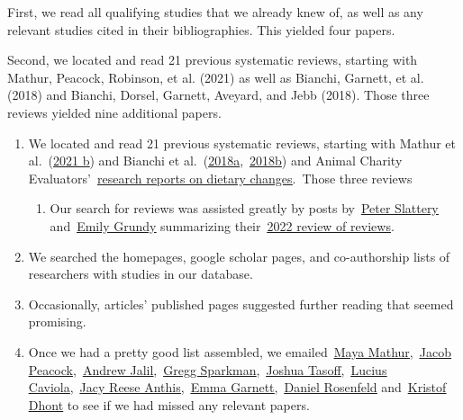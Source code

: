 \documentclass[
  man]{apa6}
\providecommand{\tightlist}{%
  \setlength{\itemsep}{0pt}\setlength{\parskip}{0pt}}
\begin{document}
First, we read all qualifying studies that we already knew of, as well as any relevant studies cited in their bibliographies. This yielded four papers.

Second, we located and read 21 previous systematic reviews, starting with Mathur, Peacock, Robinson, et al. (2021) as well as Bianchi, Garnett, et al. (2018) and Bianchi, Dorsel, Garnett, Aveyard, and Jebb (2018). Those three reviews yielded nine additional papers.

\begin{enumerate}
\def\labelenumi{\arabic{enumi}.}
\item
  We located and read 21 previous systematic reviews, starting with Mathur et al.~(\href{https://www.sciencedirect.com/science/article/pii/S0195666321001847}{\ul{2021 b}}) and Bianchi et al.~(\href{https://ijbnpa.biomedcentral.com/articles/10.1186/s12966-018-0729-6}{\ul{2018a}},~\href{https://www.thelancet.com/journals/lanplh/article/PIIS2542-5196(18)30188-8/fulltext}{\ul{2018b}}) and Animal Charity Evaluators'~\href{https://animalcharityevaluators.org/research/reports/dietary-impacts/}{\ul{research reports on dietary changes}}.~Those three reviews

  \begin{enumerate}
  \def\labelenumii{\arabic{enumii}.}
  \tightlist
  \item
    Our search for reviews was assisted greatly by posts by~\href{https://forum.effectivealtruism.org/posts/Sy7swEetrtcK2C7q6/research-summary-a-meta-review-of-interventions-that}{\ul{Peter Slattery}} and~\href{https://forum.effectivealtruism.org/posts/azHZ2pQj9JgdZLC63/what-interventions-influence-animal-product-consumption}{\ul{Emily Grundy}} summarizing their~\href{https://www.sciencedirect.com/science/article/pii/S2666833521000976\#!}{\ul{2022 review of reviews}}.
  \end{enumerate}
\item
  We searched the homepages, google scholar pages, and co-authorship lists of researchers with studies in our database.
\item
  Occasionally, articles' published pages suggested further reading that seemed promising.
\item
  Once we had a pretty good list assembled, we emailed~\href{https://www.mayamathur.com/}{\ul{Maya Mathur}},~\href{https://www.jacobpeacock.com/}{\ul{Jacob Peacock}},~\href{https://www.oxy.edu/academics/faculty/andrew-jalil}{\ul{Andrew Jalil}},~\href{https://www.bc.edu/bc-web/schools/mcas/departments/psychology/people/faculty-directory/gregg-sparkman.html}{\ul{Gregg Sparkman}},~\href{https://scholar.cgu.edu/joshua-tasoff/}{\ul{Joshua Tasoff}},~\href{https://luciuscaviola.com/}{\ul{Lucius Caviola}},~\href{https://jacyanthis.com/}{\ul{Jacy Reese Anthis}},~\href{https://www.phc.ox.ac.uk/team/emma-garnett}{\ul{Emma Garnett}},~\href{https://www.daniellrosenfeld.com/}{\ul{Daniel Rosenfeld}} and~\href{https://www.kent.ac.uk/psychology/people/220/dhont-kristof}{\ul{Kristof Dhont}} to see if we had missed any relevant papers.~
\end{enumerate}
\end{document}
